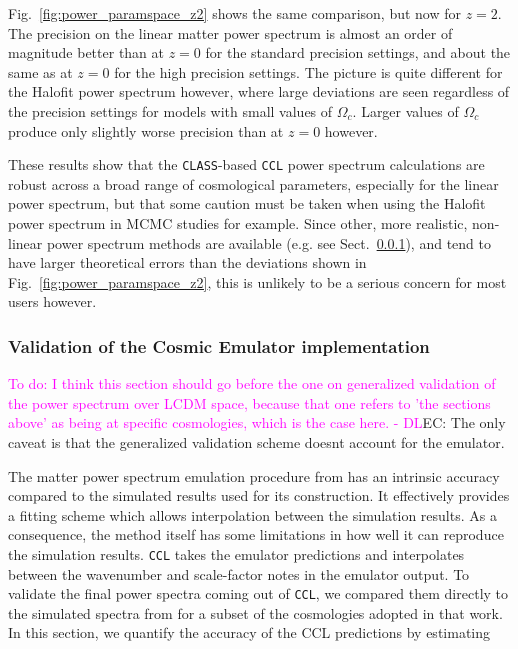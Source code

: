 \documentclass[\docopts]{\docclass}
\newcommand{\todo}[1]{\textcolor{magenta}{To do: #1}}
\newcommand{\elisa}[1]{\textcolor{green!10!orange!90!}{EC: #1}}
\newcommand{\ccl}{{\tt CCL}\xspace}
\begin{document}
Fig.~\ref{fig:power_paramspace_z2} shows the same comparison, but now for $z=2$. The precision on the linear matter power spectrum is almost an order of magnitude better than at $z=0$ for the standard precision settings, and about the same as at $z=0$ for the high precision settings. The picture is quite different for the Halofit power spectrum however, where large deviations are seen regardless of the precision settings for models with small values of $\Omega_c$. Larger values of $\Omega_c$ produce only slightly worse precision than at $z=0$ however.

These results show that the {\tt CLASS}-based \ccl power spectrum calculations are robust across a broad range of cosmological parameters, especially for the linear power spectrum, but that some caution must be taken when using the Halofit power spectrum in MCMC studies for example. Since other, more realistic, non-linear power spectrum methods are available (e.g. see Sect.~\ref{sec:cosmicemu}), and tend to have larger theoretical errors than the deviations shown in Fig.~\ref{fig:power_paramspace_z2}, this is unlikely to be a serious concern for most users however.


\subsubsection{Validation of the Cosmic Emulator implementation}
\label{sec:cosmicemu}
\todo{I think this section should go before the one on generalized validation of the power spectrum over LCDM space, because that one refers to 'the sections above' as being at specific cosmologies, which is the case here. - DL}\elisa{The only caveat is that the generalized validation scheme doesnt account for the emulator.}

The matter power spectrum emulation procedure from \citet{Lawrence17} has an intrinsic accuracy compared to the simulated results used for its construction. It effectively provides a fitting scheme which allows interpolation between the simulation results. As a consequence, the method itself has some limitations in how well it can reproduce the simulation results. \ccl takes the emulator predictions and interpolates between the wavenumber and scale-factor notes in the emulator output. To validate the final power spectra coming out of \ccl, we compared them directly to the simulated spectra from \citet{Lawrence17} for a subset of the cosmologies adopted in that work. In this section, we quantify the accuracy of the CCL predictions by estimating
\end{document}

